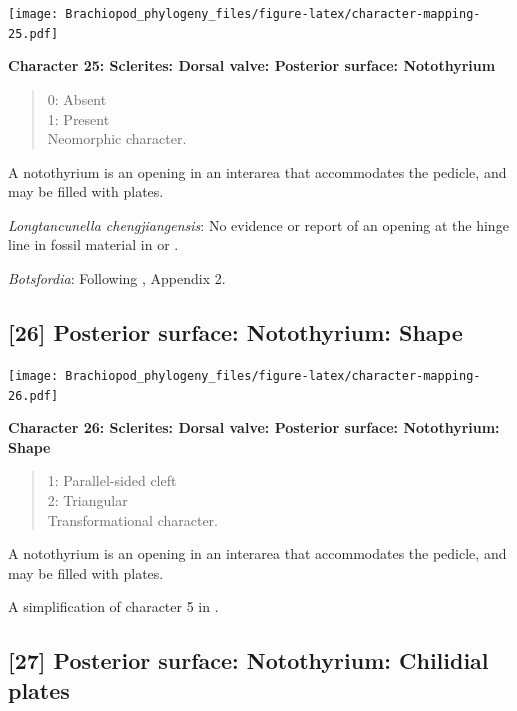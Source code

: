 \documentclass[]{book}
\theoremstyle{definition}
\theoremstyle{definition}
\theoremstyle{definition}
\theoremstyle{remark}
\begin{document}
\texttt{[image: Brachiopod\_phylogeny\_files/figure-latex/character-mapping-25.pdf]}

\textbf{Character 25: Sclerites: Dorsal valve: Posterior surface:
Notothyrium}

\begin{quote}
0: Absent\\
1: Present\\
Neomorphic character.
\end{quote}

A notothyrium is an opening in an interarea that accommodates the
pedicle, and may be filled with plates.

\emph{Longtancunella chengjiangensis}: No evidence or report of an
opening at the hinge line in fossil material in
\citet{Zhang2007Agregarious} or \citet{Zhang2011Theexceptionally}.

\emph{Botsfordia}: Following \citet{Williams1998Thediversity}, Appendix
2.

\hypertarget{posterior-surface-notothyrium-shape}{%
\subsection*{{[}26{]} Posterior surface: Notothyrium:
Shape}\label{posterior-surface-notothyrium-shape}}

\texttt{[image: Brachiopod\_phylogeny\_files/figure-latex/character-mapping-26.pdf]}

\textbf{Character 26: Sclerites: Dorsal valve: Posterior surface:
Notothyrium: Shape}

\begin{quote}
1: Parallel-sided cleft\\
2: Triangular\\
Transformational character.
\end{quote}

A notothyrium is an opening in an interarea that accommodates the
pedicle, and may be filled with plates.

A simplification of character 5 in
\citet{Bassett2001Functionalmorphology}.

\hypertarget{posterior-surface-notothyrium-chilidial-plates}{%
\subsection*{{[}27{]} Posterior surface: Notothyrium: Chilidial
plates}\label{posterior-surface-notothyrium-chilidial-plates}}
\end{document}
